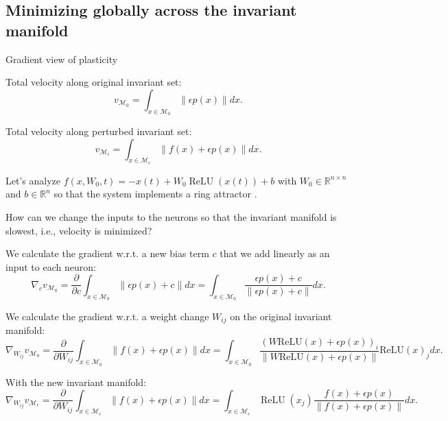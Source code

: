 \documentclass{article}
\theoremstyle{definition} \newtheorem{definition}{Definition}
\theoremstyle{remark} \newtheorem{remark}{Remark}
\newcommand{\reals}{\mathbb{R}}
\newcommand{\manifold}{\mathcal{M}}
\newcommand{\relu}{\operatorname{ReLU}}
\newcounter{ct}
\begin{document}
\subsection{Minimizing globally across the invariant manifold}
Gradient view of plasticity \citep{richards2023plasticity}

Total velocity along original invariant set:
\begin{equation}
v_{\manifold_0}   = \int_{x\in\manifold_0}  \|\epsilon p(x)\|dx.
\end{equation}

Total velocity along perturbed invariant set:
\begin{equation}
v_{\manifold_\epsilon}  =\int_{x\in\manifold_\epsilon} \|f(x) + \epsilon p(x)\|dx.
\end{equation}


Let's analyze $f(x,W_0,t) = -x(t) + W_0\relu(x(t)) + b$ with $W_0\in\reals^{n\times n}$ and $b\in\reals^n$ so that the system implements a ring attractor \citep{noorman2024accurate}.


How can we change the inputs to the neurons so that the invariant manifold is slowest, i.e., velocity is minimized?

We calculate the gradient w.r.t. a new bias term $c$ that we add linearly as an input to each neuron:
\begin{equation}
\nabla_{c}v_{\manifold_0} = \frac{\partial}{\partial c}\int_{x\in\manifold_0}  \|\epsilon p(x) + c\|dx = \int_{x\in\manifold_0}  \frac{\epsilon p(x) + c}{\|\epsilon p(x) + c\|}dx.
\end{equation}

We calculate the gradient w.r.t. a weight change $W_{ij}$ on the original invariant manifold:
\begin{equation}
\nabla_{W_{ij}}v_{\manifold_0} = \frac{\partial}{\partial W_{ij}}\int_{x\in\manifold_0}  \|f(x) + \epsilon p(x)\|dx = \int_{x\in\manifold_0} 
\frac{(W \text{ReLU}(x) + \epsilon p(x))_i}{\| W \text{ReLU}(x) + \epsilon p(x) \|} \text{ReLU}(x)_j
dx.
\end{equation}



With the new invariant manifold:
\begin{equation}
\nabla_{W_{ij}}v_{\manifold_\epsilon} = \frac{\partial}{\partial W_{ij}}\int_{x\in\manifold_{\epsilon}}  \|f(x) + \epsilon p(x)\|dx = \int_{x\in\manifold_{\epsilon}}  \relu(x_j)\frac{f(x) + \epsilon p(x)}{\|f(x) +\epsilon p(x) \|}dx.
\end{equation}
\end{document}
